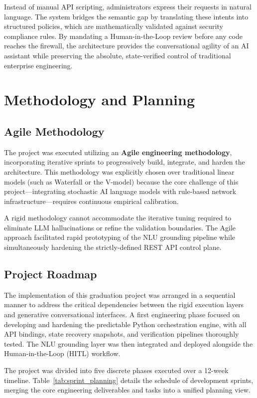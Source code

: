 Instead of manual API scripting, administrators express their requests in natural language. The system bridges the semantic gap by translating these intents into structured policies, which are mathematically validated against security compliance rules. By mandating a Human-in-the-Loop review before any code reaches the firewall, the architecture provides the conversational agility of an AI assistant while preserving the absolute, state-verified control of traditional enterprise engineering.

\section{Methodology and Planning}

\subsection{Agile Methodology}
The project was executed utilizing an \textbf{Agile engineering methodology}, incorporating iterative sprints to progressively build, integrate, and harden the architecture. This methodology was explicitly chosen over traditional linear models (such as Waterfall or the V-model) because the core challenge of this project---integrating stochastic AI language models with rule-based network infrastructure---requires continuous empirical calibration. 

A rigid methodology cannot accommodate the iterative tuning required to eliminate LLM hallucinations or refine the validation boundaries. The Agile approach facilitated rapid prototyping of the NLU grounding pipeline while simultaneously hardening the strictly-defined REST API control plane.

\subsection{Project Roadmap}
The implementation of this graduation project was arranged in a sequential manner to address the critical dependencies between the rigid execution layers and generative conversational interfaces. A first engineering phase focused on developing and hardening the predictable Python orchestration engine, with all API bindings, state recovery snapshots, and verification pipelines thoroughly tested. The NLU grounding layer was then integrated and deployed alongside the Human-in-the-Loop (HITL) workflow.

The project was divided into five discrete phases executed over a 12-week timeline. Table~\ref{tab:sprint_planning} details the schedule of development sprints, merging the core engineering deliverables and tasks into a unified planning view.

